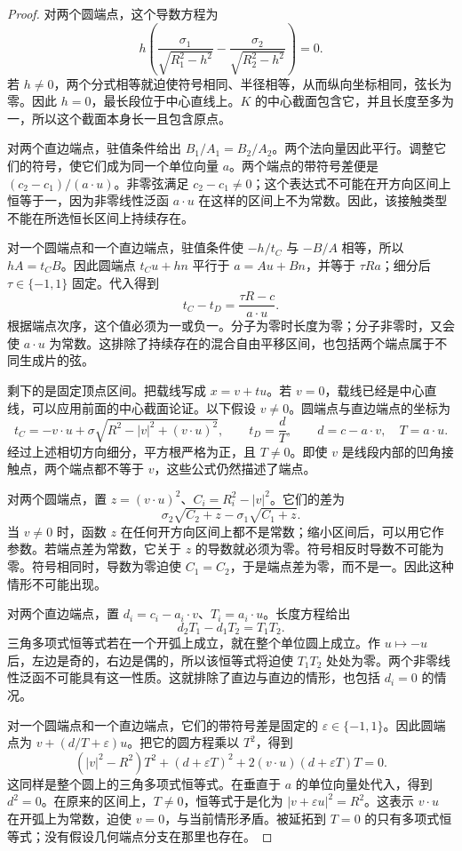 \begin{proof}
对两个圆端点，这个导数方程为
\[
 h\left(\frac{\sigma_1}{\sqrt{R_1^2-h^2}}
          -\frac{\sigma_2}{\sqrt{R_2^2-h^2}}\right)=0.
\]
若 $h\ne0$，两个分式相等就迫使符号相同、半径相等，从而纵向坐标相同，弦长为零。因此 $h=0$，最长段位于中心直线上。$K$ 的中心截面包含它，并且长度至多为一，所以这个截面本身长一且包含原点。

对两个直边端点，驻值条件给出 $B_1/A_1=B_2/A_2$。两个法向量因此平行。调整它们的符号，使它们成为同一个单位向量 $a$。两个端点的带符号差便是 $(c_2-c_1)/(a\cdot u)$。非零弦满足 $c_2-c_1\ne0$；这个表达式不可能在开方向区间上恒等于一，因为非零线性泛函 $a\cdot u$ 在这样的区间上不为常数。因此，该接触类型不能在所选恒长区间上持续存在。

对一个圆端点和一个直边端点，驻值条件使 $-h/t_C$ 与 $-B/A$ 相等，所以 $hA=t_CB$。因此圆端点 $t_Cu+hn$ 平行于 $a=Au+Bn$，并等于 $\tau Ra$；细分后 $\tau\in\{-1,1\}$ 固定。代入得到
\[
 t_C-t_D=\frac{\tau R-c}{a\cdot u}.
\]
根据端点次序，这个值必须为一或负一。分子为零时长度为零；分子非零时，又会使 $a\cdot u$ 为常数。这排除了持续存在的混合自由平移区间，也包括两个端点属于不同生成片的弦。

剩下的是固定顶点区间。把载线写成 $x=v+tu$。若 $v=0$，载线已经是中心直线，可以应用前面的中心截面论证。以下假设 $v\ne0$。圆端点与直边端点的坐标为
\[
 t_C=-v\cdot u+\sigma\sqrt{R^2-|v|^2+(v\cdot u)^2},
 \qquad t_D=\frac{d}{T},\qquad d=c-a\cdot v,\quad T=a\cdot u.
\]
经过上述相切方向细分，平方根严格为正，且 $T\ne0$。即使 $v$ 是线段内部的凹角接触点，两个端点都不等于 $v$，这些公式仍然描述了端点。

对两个圆端点，置 $z=(v\cdot u)^2$、$C_i=R_i^2-|v|^2$。它们的差为
\[
 \sigma_2\sqrt{C_2+z}-\sigma_1\sqrt{C_1+z}.
\]
当 $v\ne0$ 时，函数 $z$ 在任何开方向区间上都不是常数；缩小区间后，可以用它作参数。若端点差为常数，它关于 $z$ 的导数就必须为零。符号相反时导数不可能为零。符号相同时，导数为零迫使 $C_1=C_2$，于是端点差为零，而不是一。因此这种情形不可能出现。

对两个直边端点，置 $d_i=c_i-a_i\cdot v$、$T_i=a_i\cdot u$。长度方程给出
\[
 d_2T_1-d_1T_2=T_1T_2.
\]
三角多项式恒等式若在一个开弧上成立，就在整个单位圆上成立。作 $u\mapsto-u$ 后，左边是奇的，右边是偶的，所以该恒等式将迫使 $T_1T_2$ 处处为零。两个非零线性泛函不可能具有这一性质。这就排除了直边与直边的情形，也包括 $d_i=0$ 的情况。

对一个圆端点和一个直边端点，它们的带符号差是固定的 $\varepsilon\in\{-1,1\}$。因此圆端点为 $v+(d/T+\varepsilon)u$。把它的圆方程乘以 $T^2$，得到
\begin{equation}\label{eq:classification-mixed-identity}
 (|v|^2-R^2)T^2+(d+\varepsilon T)^2
       +2(v\cdot u)(d+\varepsilon T)T=0.
\end{equation}
这同样是整个圆上的三角多项式恒等式。在垂直于 $a$ 的单位向量处代入，得到 $d^2=0$。在原来的区间上，$T\ne0$，恒等式于是化为 $|v+\varepsilon u|^2=R^2$。这表示 $v\cdot u$ 在开弧上为常数，迫使 $v=0$，与当前情形矛盾。被延拓到 $T=0$ 的只有多项式恒等式；没有假设几何端点分支在那里也存在。


\end{proof}
